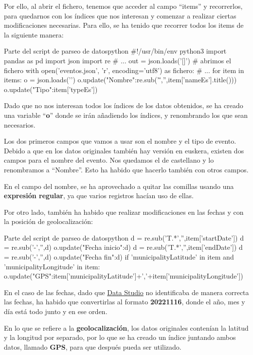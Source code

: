 \documentclass{\ClassPath/viu-tfm-template}
\begin{document}
Por ello, al abrir el fichero, tenemos que acceder al campo “items” y recorrerlos, para quedarnos con los índices que nos interesan y comenzar a realizar ciertas modificaciones necesarias. Para ello, se ha tenido que recorrer todos los items de la siguiente manera:

\begin{mycode}{Parte del script de parseo de datos}{python}{}
#!/usr/bin/env python3
import pandas as pd
import json
import re
# ...
out = json.loads('[]')
# abrimos el fichero
with open('eventos.json', 'r', encoding='utf8') as fichero:
   # ...
   for item in items:
      o = json.loads('{}')
      o.update({"Nombre":re.sub('\"','',item['nameEs'].title())})
      o.update({"Tipo":item['typeEs']})
\end{mycode}

Dado que no nos interesan todos los índices de los datos obtenidos, se ha creado una variable “\textbf{o}” donde se irán añadiendo los índices, y renombrando los que sean necesarios.

Los dos primeros campos que vamos a usar son el nombre y el tipo de evento. Debido a que en los datos originales también hay versión en euskera, existen dos campos para el nombre del evento. Nos quedamos el de castellano y lo renombramos a “Nombre”. Esto ha habido que hacerlo también con otros campos.

En el campo del nombre, se ha aprovechado a quitar las comillas usando una \textbf{expresión regular}, ya que varios registros hacían uso de ellas.

Por otro lado, también ha habido que realizar modificaciones en las fechas y con la posición de geolocalización:


\begin{mycode}{Parte del script de parseo de datos}{python}{{\footnotesize }}
d = re.sub('T.*','',item['startDate'])
d = re.sub('-','',d)
o.update({"Fecha inicio":d})
d = re.sub('T.*','',item['endDate'])
d = re.sub('-','',d)
o.update({"Fecha fin":d})
if 'municipalityLatitude' in item and 'municipalityLongitude' in item:
    o.update({"GPS":item['municipalityLatitude']+','+item['municipalityLongitude']})
\end{mycode}

En el caso de las fechas, dado que \href{https://datastudio.google.com/}{Data Studio} no identificaba de manera correcta las fechas, ha habido que convertirlas al formato \textbf{20221116}, donde el año, mes y día está todo junto y en ese orden.

En lo que se refiere a la \textbf{geolocalización}, los datos originales contenían la latitud y la longitud por separado, por lo que se ha creado un índice juntando ambos datos, llamado \textbf{GPS}, para que después pueda ser utilizado.
\end{document}

